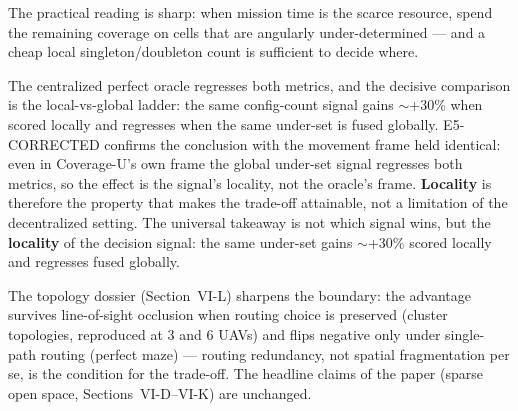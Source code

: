 \documentclass[journal]{IEEEtran}
\newcommand{\CU}{Coverage-U}
\begin{document}
The practical reading is sharp: when mission time is the scarce resource, spend
the remaining coverage on cells that are angularly under-determined --- and a
cheap local singleton/doubleton count is sufficient to decide where.

The centralized perfect oracle regresses both metrics, and the decisive
comparison is the local-vs-global ladder: the same config-count signal gains
$\sim$+30\% when scored locally and regresses when the same under-set is fused
globally. E5-CORRECTED confirms the conclusion with the movement frame held
identical: even in \CU's{} own frame the global under-set signal regresses both
metrics, so the effect is the signal's locality, not the oracle's frame.
\textbf{Locality} is therefore the property that makes the trade-off attainable,
not a limitation of the decentralized setting. The universal takeaway is not
which signal wins, but the \textbf{locality} of the decision signal: the same
under-set gains $\sim$+30\% scored locally and regresses fused globally.

The topology dossier (Section~VI-L) sharpens the boundary: the advantage
survives line-of-sight occlusion when routing choice is preserved (cluster
topologies, reproduced at 3 and 6 UAVs) and flips negative only under
single-path routing (perfect maze) --- routing redundancy, not spatial
fragmentation per se, is the condition for the trade-off. The headline claims
of the paper (sparse open space, Sections~VI-D--VI-K) are unchanged.
\end{document}
